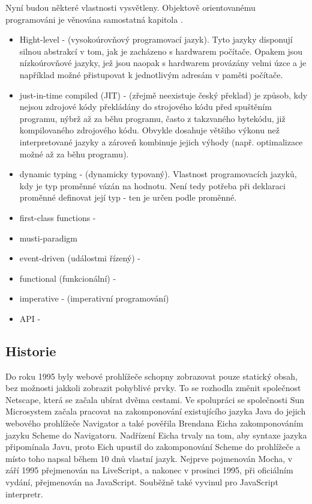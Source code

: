 \documentclass[main.tex]{subfiles}
\begin{document}
Nyní budou některé vlastnosti vysvětleny. Objektově orientovanému programováni je věnována samostatná kapitola .
\begin{itemize}
    \item Hight-level - (vysokoúrovňový programovací jazyk). Tyto jazyky disponují silnou abstrakcí v tom, jak je zacházeno s hardwarem počítače. Opakem jsou nízkoúrovňové jazyky, jež jsou naopak s hardwarem provázány velmi úzce a je například možné přistupovat k jednotlivým adresám v paměti počítače.
    \item just-in-time compiled (JIT) - (zřejmě neexistuje český překlad) je způsob, kdy nejsou zdrojové kódy překládány do strojového kódu před spuštěním programu, nýbrž až za běhu programu, často z takzvaného bytekódu, již kompilovaného zdrojového kódu. Obvykle dosahuje většiho výkonu než interpretované jazyky a zároveň kombinuje jejich výhody (např. optimalizace možné až za běhu programu).
    \item dynamic typing - (dynamicky typovaný). Vlastnost programovacích jazyků, kdy je typ proměnné vázán na hodnotu. Není tedy potřeba při deklaraci proměnné definovat její typ - ten je určen podle proměnné.
    \item first-class functions - 

    \item musti-paradigm

    \item event-driven (událostmi řízený) - 
    \item functional (funkcionální) - 
    \item imperative - (imperativní programování) 
    \item API - 
\end{itemize}

\subsection{Historie}
Do roku 1995 byly webové prohlížeče schopny zobrazovat pouze statický obsah, bez možnosti jakkoli zobrazit pohyblivé prvky. To se rozhodla změnit společnost Netscape, která se začala ubírat dvěma cestami. Ve spolupráci se společnosti Sun Microsystem začala pracovat na zakomponování existujícího jazyka Java do jejich webového prohlížeče Navigator a také pověřila Brendana Eicha zakomponováním jazyku Scheme do Navigatoru. Nadřízení Eicha trvaly na tom, aby syntaxe jazyka připomínala Javu, proto Eich upustil do zakomponování Scheme do prohlížeče a místo toho napsal během 10 dnů vlastní jazyk. Nejprve pojmenován Mocha, v září 1995 přejmenován na LiveScript, a nakonec v prosinci 1995, při oficiálním vydání, přejmenován na JavaScript. Souběžně také vyvinul pro JavaScript interpretr.
\end{document}
